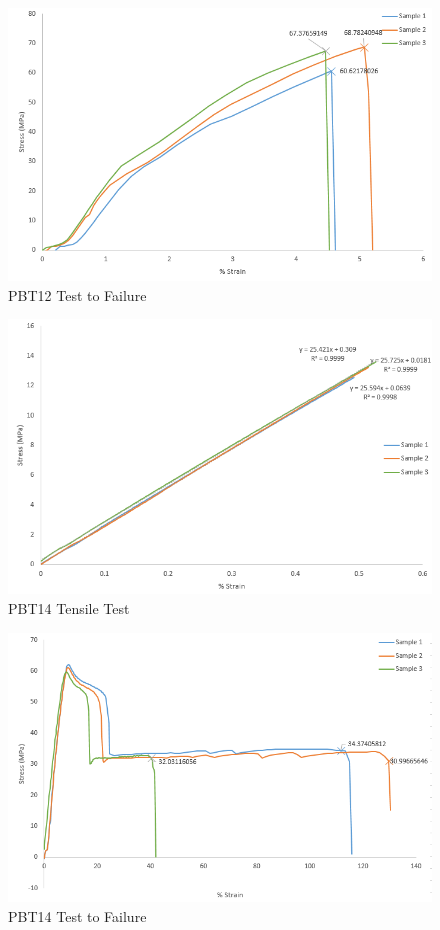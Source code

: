 \documentclass[11pt]{article}
\begin{document}
\begin{figure}[H]
\centering
\includegraphics[width=.95\linewidth]{figures/PBT12_Fail.png}
\caption{PBT12 Test to Failure}
\label{pbt12fail}
\end{figure}



\begin{figure}[H]
\centering
\includegraphics[width=.95\linewidth]{figures/PBT14_Tensile.png}
\caption{PBT14 Tensile Test}
\label{pbt14tensile}
\end{figure}

\begin{figure}[H]
\centering
\includegraphics[width=.95\linewidth]{figures/PBT14_Fail.png}
\caption{PBT14 Test to Failure}
\label{pbt14fail}
\end{figure}
\end{document}
